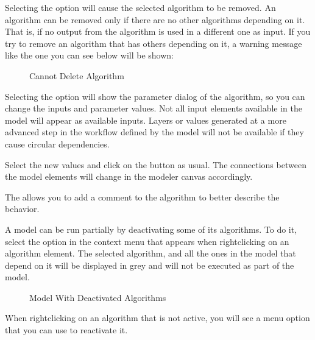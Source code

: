 \documentclass[letterpaper,10pt,english]{sphinxmanual}
\begin{document}
\sphinxAtStartPar
Selecting the  option will cause the selected
algorithm to be removed.
An algorithm can be removed only if there are no other algorithms
depending on it.
That is, if no output from the algorithm is used in a different one as
input.
If you try to remove an algorithm that has others depending on it, a
warning message like the one you can see below will be shown:

\begin{figure}[H]
\centering
\capstart

\noindent{}
\caption{Cannot Delete Algorithm}\label{\detokenize{Introduction/models:id11}}\label{\detokenize{Introduction/models:figure-cannot-delete-alg}}\end{figure}

\sphinxAtStartPar
Selecting the  option will show the parameter dialog
of the algorithm, so you can change the inputs and parameter values.
Not all input elements available in the model will appear as
available inputs.
Layers or values generated at a more advanced step in the workflow
defined by the model will not be available if they cause circular
dependencies.

\sphinxAtStartPar
Select the new values and click on the  button as usual.
The connections between the model elements will change in the modeler
canvas accordingly.

\sphinxAtStartPar
The  allows you to add a comment to the algorithm to
better describe the behavior.

\sphinxAtStartPar
A model can be run partially by deactivating some of its algorithms.
To do it, select the  option in the context menu
that appears when right\sphinxhyphen{}clicking on an algorithm element.
The selected algorithm, and all the ones in the model that depend on it
will be displayed in grey and will not be executed as part of the model.

\begin{figure}[H]
\centering
\capstart

\noindent{}
\caption{Model With Deactivated Algorithms}\label{\detokenize{Introduction/models:id12}}\label{\detokenize{Introduction/models:figure-cannot-model-deactivate}}\end{figure}

\sphinxAtStartPar
When right\sphinxhyphen{}clicking on an algorithm that is not active, you will
see a  menu option that you can use to reactivate
it.
\end{document}
